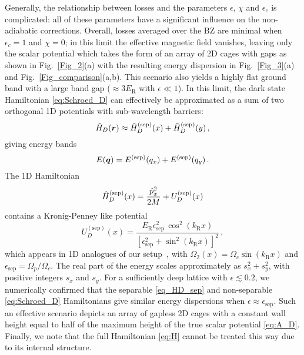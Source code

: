 \documentclass[aps,pra,twocolumn,showpacs,superscriptaddress,floatfix,longbibliography]{revtex4-1}
\def\kr{k_{\mathrm R}}                            			%
\def\Er{E_{\mathrm R}}                            			%
\begin{document}
Generally, the relationship between losses and the parameters $\epsilon$, $\chi$ and $\epsilon_c$ is complicated: all of these parameters have a significant influence on the non-adiabatic corrections.
Overall, losses averaged over the BZ are minimal when $\epsilon_c = 1$ and $\chi = 0$; in this limit the effective magnetic field vanishes, leaving only the scalar potential which takes the form of an array of 2D cages with gaps as shown in Fig.~\ref{Fig_2}(a) with the resulting energy dispersion in Fig.~\ref{Fig_3}(a) and Fig.~\ref{Fig_comparison}(a,b). This scenario also yields a highly flat ground band with a large band gap ($\approx 3 \Er$ with $\epsilon \ll 1$).
In this limit, the dark state Hamiltonian \eqref{eq:Schroed_D} can effectively be approximated as a sum of two orthogonal 1D potentials with sub-wavelength barriers:
\begin{equation}
\hat{H}_D(\boldsymbol{r}) \approx \hat{H}^{\rm (sep)}_D(x)+\hat{H}_D^{\rm (sep)}(y)\,,
\label{eq_HD_sep}
\end{equation}
giving energy bands
\begin{equation}
E(\boldsymbol{q})=E^{\rm (sep)}(q_{x})+E^{\rm (sep)}(q_{y})\,.\label{sum_rule}
\end{equation}
%
The 1D Hamiltonian
%
\begin{equation}
\hat{H}_D^{\rm (sep)}(x) = \frac{\hat{p}_x^{2}}{2M}+U_D^{\rm (sep)}(x)
\end{equation}
%
contains a Kronig-Penney like potential
%
\begin{equation}
U^{(\text{sep})}_D(x)=\frac{ \Er \epsilon_{\text{sep}}^{2}\,\cos^{2}{(\kr x)}}{\left[\epsilon_{\text{sep}}^{2}+\sin^{2}{(\kr x)}\right]^{2}} \, ,
\label{U_D_2D_s}
\end{equation}
%
which appears in 1D analogues of our setup~\cite{Zoller2016, Wang2018}, with $\Omega_2(x) = \Omega_c \sin{(\kr x)}$ and $\epsilon_{\text{sep}} = \Omega_p / \Omega_c$.
The real part of the energy scales approximately as $s^2_x + s^2_y$, with positive integers $s_x$ and $s_y$.
For a sufficiently deep lattice with $\epsilon \lesssim 0.2$, we numerically confirmed that the separable \eqref{eq_HD_sep} and non-separable \eqref{eq:Schroed_D} Hamiltonians give similar energy dispersions when $\epsilon \approx \epsilon_{\text{sep}}$.
Such an effective scenario depicts an array of gapless 2D cages with a constant wall height equal to half of the maximum height of the true scalar potential \eqref{eq:A_D}.
Finally, we note that the full Hamiltonian \eqref{eq:H} cannot be treated this way due to its internal structure.
\end{document}
